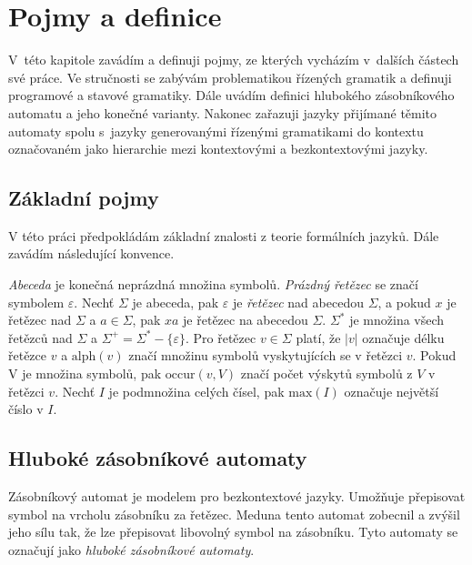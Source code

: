 \chapter{Pojmy a definice}

V~této kapitole zavádím a definuji pojmy, ze kterých vycházím v~dalších částech své práce. Ve stručnosti se zabývám problematikou řízených gramatik a definuji programové a stavové gramatiky. Dále uvádím definici hlubokého zásobníkového automatu a jeho konečné varianty. Nakonec zařazuji jazyky přijímané těmito automaty spolu s~jazyky generovanými řízenými gramatikami do kontextu označovaném jako hierarchie mezi kontextovými a bezkontextovými jazyky.

\section{Základní pojmy}

V této práci předpokládám základní znalosti z teorie formálních jazyků. Dále zavádím následující konvence.

\emph{Abeceda} je konečná neprázdná množina symbolů. 
\emph{Prázdný řetězec} se značí symbolem $\varepsilon$. 
Nechť $\Sigma$ je abeceda, pak $\varepsilon$ je \emph{řetězec} nad abecedou $\Sigma$, a pokud $x$ je řetězec nad $\Sigma$ a $a \in \Sigma$, pak $xa$ je řetězec na abecedou $\Sigma$.  
$\Sigma^*$ je množina všech řetězců nad $\Sigma$ a $\Sigma^+ = \Sigma^* - \{\varepsilon\}$. 
Pro řetězec $v \in \Sigma$ platí, že $|v|$ označuje délku řetězce $v$ a $\mathrm{alph}(v)$ značí množinu symbolů vyskytujících se v řetězci $v$. Pokud V je množina symbolů, pak $\mathrm{occur}(v, V)$ značí počet výskytů symbolů z $V$ v řetězci $v$. 
Nechť $I$ je podmnožina celých čísel, pak $\mathrm{max}(I)$ označuje největší číslo v $I$.

\section{Hluboké zásobníkové automaty}

Zásobníkový automat je modelem pro bezkontextové jazyky. Umožňuje přepisovat symbol na vrcholu zásobníku za řetězec. Meduna tento automat zobecnil a zvýšil jeho sílu tak, že lze přepisovat libovolný symbol na zásobníku. Tyto automaty se označují jako \emph{hluboké zásobníkové automaty}. 

